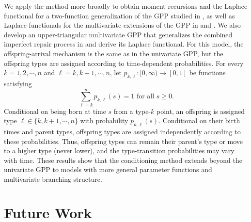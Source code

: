 \documentclass[11pt]{article}
\newenvironment{changemargin}[2]{%
\begin{list}{}{%
\setlength{\topsep}{0pt}%
\setlength{\leftmargin}{#1}%
\setlength{\rightmargin}{#2}%
\setlength{\listparindent}{\parindent}%
\setlength{\itemindent}{\parindent}%
\setlength{\parsep}{\parskip}%
}%
\item[]}{\end{list}}
\begin{document}
\begin{changemargin}{-0.5cm}{-0.5cm}
We apply the method more broadly to obtain moment recursions and the Laplace functional for a two-function generalization of the GPP studied in \cite{Willmot2010}, as well as Laplace functionals for the multivariate extensions of the GPP in \cite{ChaGiorgio2016} and \cite{ChaBadia2020}. We also develop an upper-triangular multivariate GPP that generalizes the combined imperfect repair process in \cite{ChaFinkelstein2024} and derive its Laplace functional. For this model, the offspring-arrival mechanism is the same as in the univariate GPP, but the offspring types are assigned according to time-dependent probabilities. For every $k = 1,2, \cdots , n$ and $\ell = k, k+1, \cdots, n$, let  $p_{k,\ell}:[0,\infty) \to [0,1]$ be functions satisfying
$$\sum_{\ell = k}^n p_{k,\ell}(s) = 1 \text{ for all } s \ge 0.$$ Conditional on being born at time $s$ from a type-$k$ point, an offspring is assigned type $\ell \in \{k, k+1, \cdots, n\}$ with probability $p_{k,\ell}(s)$. Conditional on their birth times and parent types, offspring types are assigned independently according to these probabilities. Thus, offspring types can remain their parent's type or move to a higher type (never lower), and the type-transition probabilities may vary with time. These results show that the conditioning method extends beyond the univariate GPP to models with more general parameter functions and multivariate branching structure.



\section*{Future Work}


\end{changemargin}
\end{document}
